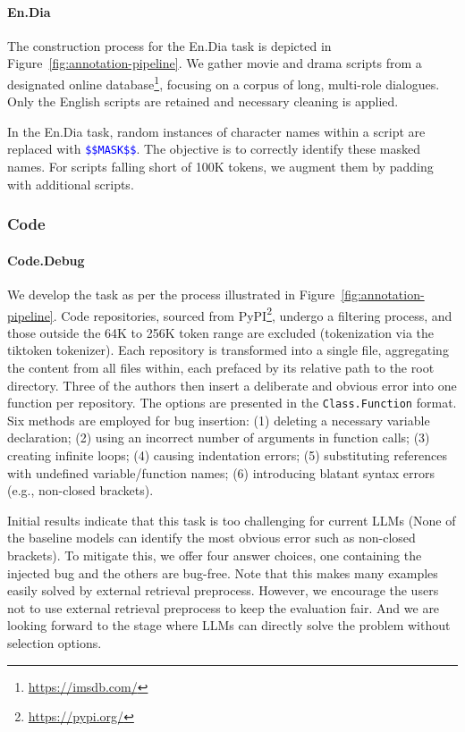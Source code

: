 \paragraph{En.Dia}

The construction process for the En.Dia task is depicted in Figure~\ref{fig:annotation-pipeline}. We gather movie and drama scripts from a designated online database\footnote{\url{https://imsdb.com/}}, focusing on a corpus of long, multi-role dialogues. Only the English scripts are retained and necessary cleaning is applied.

In the En.Dia task, random instances of character names within a script are replaced with \textcolor{blue}{\texttt{\$\$MASK\$\$}}. The objective is to correctly identify these masked names. For scripts falling short of 100K tokens, we augment them by padding with additional scripts.

\subsubsection{Code}

\paragraph{Code.Debug} 

We develop the task as per the process illustrated in Figure~\ref{fig:annotation-pipeline}. Code repositories, sourced from PyPI\footnote{\label{PyPI}\url{https://pypi.org/}}, undergo a filtering process, and those outside the 64K to 256K token range are excluded (tokenization via the tiktoken tokenizer\cite{Tiktoken}). Each repository is transformed into a single file, aggregating the content from all files within, each prefaced by its relative path to the root directory. Three of the authors then insert a deliberate and obvious error into one function per repository. The options are presented in the \texttt{Class.Function} format. Six methods are employed for bug insertion: (1) deleting a necessary variable declaration; (2) using an incorrect number of arguments in function calls; (3) creating infinite loops; (4) causing indentation errors; (5) substituting references with undefined variable/function names; (6) introducing blatant syntax errors (e.g., non-closed brackets).

Initial results indicate that this task is too challenging for current LLMs (None of the baseline models can identify the most obvious error such as non-closed brackets). To mitigate this, we offer four answer choices, one containing the injected bug and the others are bug-free. Note that this makes many examples easily solved by external retrieval preprocess. However, we encourage the users not to use external retrieval preprocess to keep the evaluation fair. And we are looking forward to the stage where LLMs can directly solve the problem without selection options.

